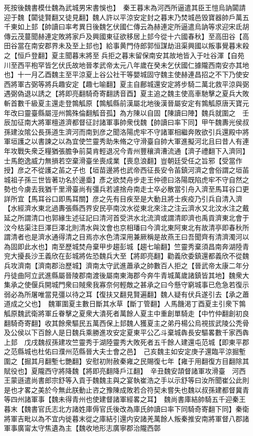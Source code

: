 死按後魏書模仕魏為武城男宋書悞也】　秦王暮末為河西所逼遣其臣王愷烏訥闐請迎于魏【闐徒賢翻又徒見翻】魏人許以平涼安定封之暮末乃焚城邑毁寶器帥戶萬五千東如上邽【帥讀曰率考異日後魏乞伏國仁傳云為赫連定所逼遣烏訥等求迎宋氐胡傳云茂蔓聞赫連定敗將家戶及興國東征欲移居上邽今從十六國春秋】至高田谷【高田谷當在南安郡界未及至上邽也】給事黄門侍郎郭恒謀劫沮渠興國以叛事覺暮末殺之【恒戶登翻】夏主聞暮末將至兵拒之暮末留保南安其故地皆入于吐谷渾【自苑川至西平枹罕皆乞伏氏故地晉孝武帝太元八年歲在癸未乞伏國仁據隴西南安亦其地也】十一月乙酉魏主至平涼夏上谷公社干等嬰城固守魏主使赫連昌招之不下乃使安西將軍古弼等將兵趣安定【趣七喻翻】夏主自鄜城還安定將步騎二萬北救平涼與弼遇弼偽退以誘之【將即亮翻騎奇寄翻誘音酉】夏主追之魏主使高車馳擊之夏兵大敗斬首數千級夏主還走登鶉觚原【鶉觚縣前漢屬北地後漢晉屬安定有鶉觚原唐天寶元年改曰靈臺縣屬涇州鶉殊倫翻觚音孤】為方陳以自固【陳讀曰陣】魏兵就圍之　壬辰加征南大將軍檀道濟都督征討諸軍事帥衆伐魏【帥讀曰率下同】甲午魏夀光侯叔孫建汝隂公長孫道生濟河而南到彦之聞洛陽虎牢不守諸軍相繼奔敗欲引兵還殿中將軍垣護之以書諫之以為宜使竺靈秀助朱脩之守滑臺自帥大軍進擬河北且曰昔人有連年攻戰失衆乏糧猶張膽争前莫肯輕退况今青州豐穰濟漕流通【濟子禮翻下入濟同】士馬飽逸威力無損若空棄滑臺坐喪成業【喪息浪翻】豈朝廷受任之旨邪【受當作授】彦之不從護之苖之子也【垣苗邊將也武帝西征長安令苖鎮河濟之會俗謂之垣苖城祖子孫三世皆著功名於邊埀】彥之欲焚舟步走王仲德曰洛陽既陷虎牢不守自然之勢也今虜去我猶千里滑臺尚有彊兵若遽捨舟南走士卒必散當引舟入濟至馬耳谷口更詳所宜【馬耳谷口即馬耳關】彦之先有目疾至是大動且將士疾疫乃引兵自清入濟【水經濟水東北過夀張縣西界安民亭南汶水從東北來注之注云濟水又北汶水注之戴延之所謂清口也郭緣生述征記曰清河首受洪水北流濟或謂清即濟也禹貢濟東北會于汶今枯渠注巨澤巨澤北則清水與汶會也京相璠曰今濟北東阿東北有故清亭即春秋所謂清者也是濟水通得清之目焉亦水色清深用兼厥稱是故燕王曰吾聞齊有清濟濁河以為固即此水也】南至歷城焚舟棄甲步趨彭城【趨七喻翻】竺靈秀棄須昌南奔湖陸青兖大擾長沙王義欣在彭城將佐恐魏兵大至【將即亮翻】勸義欣委鎮還都義欣不從魏兵攻濟南【濟南郡治歷城】濟南太守武進蕭承之帥數百人拒之【晉武帝太康二年分丹徒曲阿立武進縣屬晉陵郡南渡後屬南東海郡今奔牛青城萬歲諸鎮皆其地】魏衆大集承之使偃兵開城門衆曰賊衆我寡奈何輕敵之甚承之曰今懸守窮城事已危急若復示弱必為所屠唯當見彊以待之耳【復扶又翻見賢遍翻】魏人疑有伏兵遂引去【承之蕭道成之父也】　魏軍圍夏主數日斷其水草【斷丁管翻】人馬饑渇丁酉夏主引衆下鶉觚原魏武衛將軍丘眷擊之夏衆大潰死者萬餘人夏主中重創單騎走【中竹仲翻創初良翻騎奇寄翻】收其餘衆驅民五萬西保上邽魏人獲夏主之弟丹楊公烏視拔武陵公秃骨及公侯以下百餘人是日魏兵乘勝進攻安定夏東平公乙斗棄城犇長安驅畧數千家西犇上邽　戊戌魏叔孫建攻竺靈秀于湖陸靈秀大敗死者五千餘人建還屯范城【即東平郡之范縣城也杜佑曰濮州范縣晉大夫士會之邑】　己亥魏主如安定庚子還臨平涼掘塹圍之【掘其月翻塹七艷翻】安慰初附赦秦雍之民賜復七年【雍于用翻復方目翻除其賦役也】夏隴西守將降魏【將即亮翻降戶江翻】　辛丑魏安頡督諸軍攻滑臺　河西王蒙遜遣尚書郎宗舒等入貢于魏魏主與之宴執崔浩之手以示舒等曰汝所聞崔公此則是也才畧之美於今無此朕動止咨之豫陳成敗若合符契未嘗失也魏以叔孫建都督冀青等四州諸軍事【魏未得青州也使建督諸軍經畧之耳】　魏尚書庫結帥騎五千迎秦王暮末【魏書官氏志北方諸姓庫傉官氏後改為庫氏帥讀曰率下同騎奇寄翻下同】秦衛將軍吉毗以為不宜内徙暮末從之庫結引還内安諸羌萬餘人叛秦推安南將軍督八郡諸軍事廣甯太守焦遺為主【魏收地形志廣寧郡治隴西鄣